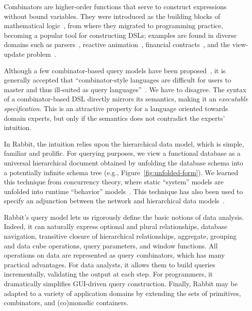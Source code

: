 Combinators are higher-order functions that serve to construct expressions
without bound variables.  They were introduced as the building blocks of
mathematical logic~\cite{Schoenfinkel1924, Curry1930}, from where they migrated
to programming practice, becoming a popular tool for constructing DSLs;
examples are found in diverse domains such as parsers~\cite{Wadler1985,
Hutton1996}, reactive animation~\cite{Elliott1997}, financial
contracts~\cite{Jones2000}, and the view-update problem~\cite{Foster2005}.

Although a few combinator-based query models have been
proposed~\cite{Buneman1979, Bossi1984, Batory1988, Erwig1991, Cherniack1996},
it is generally accepted that ``combinator-style languages are difficult for
users to master and thus ill-suited as query languages''~\cite{Cherniack1996}.
We have to disagree.  The syntax of a combinator-based DSL directly mirrors its
semantics, making it an \emph{executable specification}.  This is an attractive
property for a language oriented towards domain experts, but only if the
semantics does not contradict the experts' intuition.

In Rabbit, the intuition relies upon the hierarchical data model, which is
simple, familiar and prolific.  For querying purposes, we view a functional
database as a universal hierarchical document obtained by unfolding the
database schema into a potentially infinite schema tree (e.g.,
Figure~\ref{fig:unfolded-form}).  We learned this technique from concurrency
theory, where static ``system'' models are unfolded into runtime ``behavior''
models~\cite{Nielsen1994}.  This technique has also been used to specify an
adjunction between the network and hierarchical data
models~\cite{Cartmell1985}.

Rabbit's query model lets us rigorously define the basic notions of data
analysis.  Indeed, it can naturally express optional and plural relationships,
database navigation, transitive closure of hierarchical relationships,
aggregate, grouping and data cube operations, query parameters, and window
functions.  All operations on data are represented as query combinators, which
has many practical advantages.  For data analysts, it allows them to build
queries incrementally, validating the output at each step.  For programmers, it
dramatically simplifies GUI-driven query construction.  Finally, Rabbit may be
adapted to a variety of application domains by extending the sets of
primitives, combinators, and (co)monadic containers.


